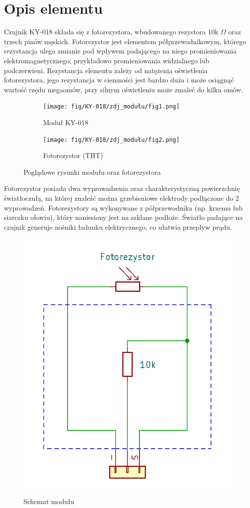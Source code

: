 \documentclass[11pt, a4paper]{article}
\author{Dawid Wasung}
\institute{Instytut Robotyki i Inteligencji Maszynowej}
\begin{document}
\newpage

\section*{Opis elementu} 
Czujnik KY-018 składa się z fotorezystora, wbudowanego rezystora 10k $\Omega$ oraz trzech pinów męskich. Fotorezystor jest elementem półprzewodnikowym, którego rezystancja ulega zmianie pod wpływem padającego na niego promieniowania elektromagnetycznego; przykładowo promieniowania widzialnego lub podczerwieni. Rezystancja elementu zależy od natężenia oświetlenia fotorezystora, jego rezystancja w ciemności jest bardzo duża i może osiągnąć wartość rzędu megaomów, przy silnym oświetleniu może zmaleć do kilku omów.
\vspace{0.5cm}
\begin{figure}[h!]
\centering
\begin{subfigure}{.5\textwidth}
  \centering
  \texttt{[image: fig/KY-018/zdj\_modułu/fig1.png]}
  \caption{Moduł KY-018 \cite{ArduinoModules:Switch}}
  \label{fig:sub1}
\end{subfigure}%
\begin{subfigure}{.5\textwidth}
  \centering
  \texttt{[image: fig/KY-018/zdj\_modułu/fig2.png]}
  \caption{Fotorezystor (THT) \cite{ArduinoModules:grab}}
  \label{fig:sub2}
\end{subfigure}
\caption{Poglądowe rysunki modułu oraz fotorezystora}
\label{fig:test}
\end{figure}

Fotorezystor posiada dwa wyprowadzenia oraz charakterystyczną powierzchnię światłoczułą, na której znaleźć można grzebieniowe elektrody podłączone do 2 wyprowadzeń. Fotorezystory są wykonywane z półprzewodnika (np. krzemu lub siarczku ołowiu), który naniesiony jest na szklane podłoże. Światło padające na czujnik generuje nośniki ładunku elektrycznego, co ułatwia przepływ prądu.

\begin{figure}[h!]
\centering
\includegraphics[width=.37\linewidth]{fig/KY-018/zasada_dzialania/schemacik.png}
\caption{Schemat modułu}
\label{fig:sub2}
\end{figure}
\end{document}
